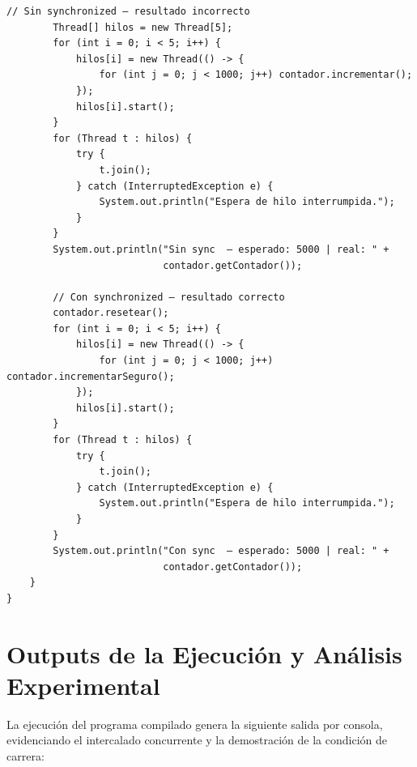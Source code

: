 \documentclass[11pt,letterpaper]{article}
\begin{document}
\begin{lstlisting}[style=JavaStyle]
        // Sin synchronized — resultado incorrecto
        Thread[] hilos = new Thread[5];
        for (int i = 0; i < 5; i++) {
            hilos[i] = new Thread(() -> {
                for (int j = 0; j < 1000; j++) contador.incrementar();
            });
            hilos[i].start();
        }
        for (Thread t : hilos) {
            try {
                t.join();
            } catch (InterruptedException e) {
                System.out.println("Espera de hilo interrumpida.");
            }
        }
        System.out.println("Sin sync  — esperado: 5000 | real: " +
                           contador.getContador());

        // Con synchronized — resultado correcto
        contador.resetear();
        for (int i = 0; i < 5; i++) {
            hilos[i] = new Thread(() -> {
                for (int j = 0; j < 1000; j++) contador.incrementarSeguro();
            });
            hilos[i].start();
        }
        for (Thread t : hilos) {
            try {
                t.join();
            } catch (InterruptedException e) {
                System.out.println("Espera de hilo interrumpida.");
            }
        }
        System.out.println("Con sync  — esperado: 5000 | real: " +
                           contador.getContador());
    }
}
\end{lstlisting}

\section{Outputs de la Ejecución y Análisis Experimental}

La ejecución del programa compilado genera la siguiente salida por consola, evidenciando el intercalado concurrente y la demostración de la condición de carrera:
\end{document}
